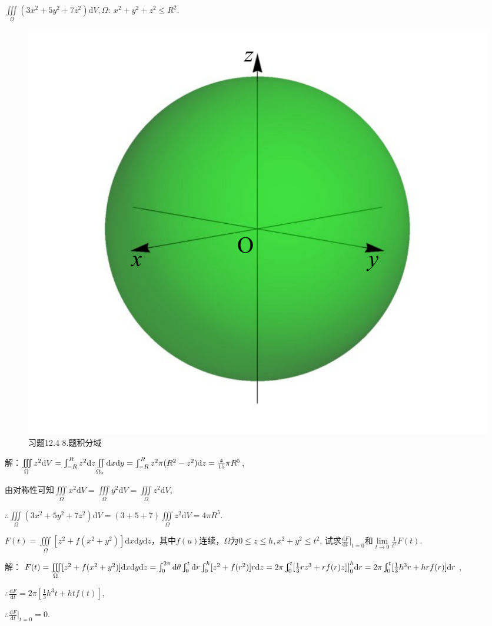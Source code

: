 \documentclass[12pt,UTF8]{ctexart}
\newcommand\LIM[2]{\lim\limits_{#1\rightarrow#2}}
\newcommand{\Int}[4]{\varint\nolimits_{#1}^{#2}#3\mathrm d#4}
\newcommand{\varIInt}[4]{\iint\limits_{#1}#2\mathrm d#3\mathrm d#4}
\newcommand{\IIInt}[3]{\iiint\limits_{#1}#2\mathrm d#3}
\newcommand{\varIIInt}[5]{\iiint\limits_{#1}#2\mathrm d#3\mathrm d#4\mathrm d#5}
\begin{document}
\begin{enumerate}
$\IIInt\Omega{(3x^2+5y^2+7z^2)}V,\Omega:\ x^2+y^2+z^2\leqslant R^2$.

\begin{figure}[H]
\begin{center}
\includegraphics[height=0.4\textheight]{Figures19/Fig12-4-8.pdf}
\end{center}
\caption{习题12.4 8.题积分域}
\label{12-4-8}
\end{figure}

解：$\IIInt\Omega{z^2}V=\Int{-R}R{z^2}z\varIInt{\Omega_z}{}xy=\Int{-R}R{z^2\pi(R^2-z^2)}z=\frac4{15}\pi R^5$,

由对称性可知$\IIInt\Omega{x^2}V=\IIInt\Omega{y^2}V=\IIInt\Omega{z^2}V$,

$\therefore\IIInt\Omega{(3x^2+5y^2+7z^2)}V=(3+5+7)\IIInt\Omega{z^2}V=4\pi R^5$.

$F(t)=\varIIInt\Omega{[z^2+f(x^2+y^2)]}xyz$，其中$f(u)$连续，$\Omega$为$0\leqslant z\leqslant h,x^2+y^2\leqslant t^2$. 试求$\frac{\mathrm dF}{\mathrm dt}\Big|_{t=0}$和$\LIM t0\frac1{t^2}F(t)$.

解：$F(t)=\varIIInt\Omega{[z^2+f(x^2+y^2)]}xyz=\Int0{2\pi}{}\theta\Int0t{}r\Int0h{[z^2+f(r^2)]r}z\\
=2\pi\Int0t{[\frac13rz^3+rf(r)z]\big|_0^h}r=2\pi\Int0t{[\frac13h^3r+hrf(r)]}r$,

$\therefore\frac{\mathrm dF}{\mathrm dt}=2\pi[\frac13h^3t+htf(t)]$,

$\therefore\frac{\mathrm dF}{\mathrm dt}\Big|_{t=0}=0$.


\end{enumerate}
\end{document}
